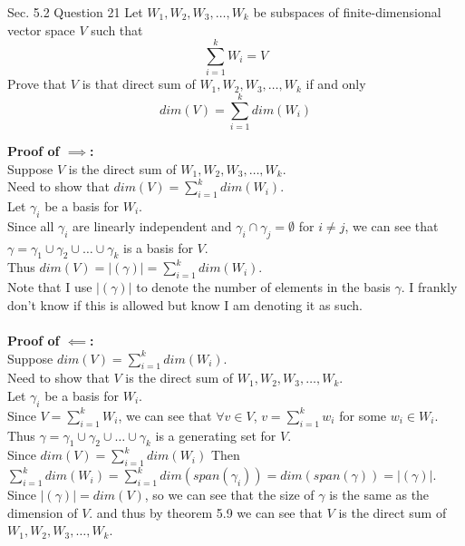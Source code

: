 \documentclass[answers,12pt,addpoints]{exam}
\begin{document}
\begin{questions}
    \question[10] Sec. 5.2 Question 21
    Let $W_1, W_2, W_3, \ldots, W_k$ be subspaces of finite-dimensional vector space $V$ such that 
    $$ \sum_{i=1}^{k} W_i = V$$
    Prove that $V$ is that direct sum of $W_1, W_2, W_3, \ldots, W_k$ if and only 
    $$ dim(V) = \sum_{i=1}^{k} dim(W_i)$$
    \begin{solution}
        \textbf{Proof of $\implies$:}\\
        Suppose $V$ is the direct sum of $W_1, W_2, W_3, \ldots, W_k$.\\
        Need to show that $dim(V) = \sum_{i=1}^{k} dim(W_i)$.\\
        Let $\gamma_i$ be a basis for $W_i$.\\
        Since all $\gamma_i$ are linearly independent and $\gamma_i \cap \gamma_j = \emptyset$ for $i \neq j$, we can see that $\gamma = \gamma_1 \cup \gamma_2 \cup \ldots \cup \gamma_k$ is a basis for $V$.\\
        Thus $dim(V) = |(\gamma)| = \sum_{i=1}^{k} dim(W_i)$.\\
        Note that I use $|(\gamma)|$ to denote the number of elements in the basis $\gamma$. I frankly don't know if this is allowed but know I am denoting it as such.\\\\
        \textbf{Proof of $\impliedby$:}\\
        Suppose $dim(V) = \sum_{i=1}^{k} dim(W_i)$.\\
        Need to show that $V$ is the direct sum of $W_1, W_2, W_3, \ldots, W_k$.\\
        Let $\gamma_i$ be a basis for $W_i$.\\
        Since $V = \sum_{i = 1}^{k} W_i$, we can see that $\forall v \in V$, $v = \sum_{i = 1}^{k} w_i$ for some $w_i \in W_i$.\\
        Thus $\gamma = \gamma_1 \cup \gamma_2 \cup \ldots \cup \gamma_k$ is a generating set for $V$.\\
        Since $dim(V) = \sum_{i=1}^{k} dim(W_i)$
        Then $\sum_{i=1}^{k} dim(W_i) = \sum_{i=1}^{k}dim(span(\gamma_i)) = dim(span(\gamma)) = |(\gamma)|$.\\
        Since $|(\gamma)| = dim(V)$, so we can see that the size of $\gamma$ is the same as the dimension of $V$. and thus by theorem 5.9 we can see that $V$ is the direct sum of $W_1, W_2, W_3, \ldots, W_k$.
    \end{solution}


\end{questions}
\end{document}
